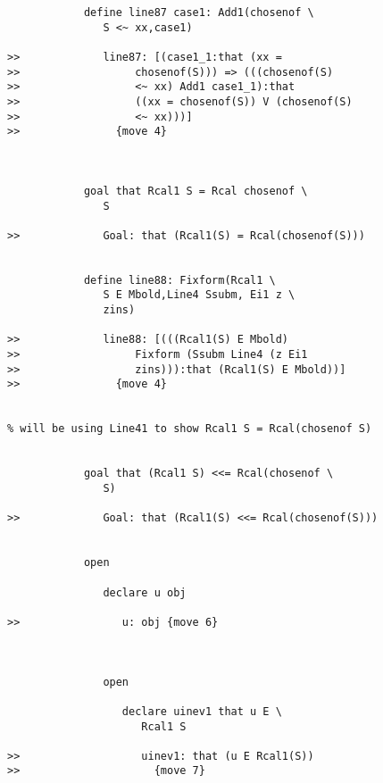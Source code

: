 \documentclass[12pt]{article}
\begin{document}
\begin{verbatim}
            define line87 case1: Add1(chosenof \
               S <~ xx,case1)

>>             line87: [(case1_1:that (xx =
>>                  chosenof(S))) => (((chosenof(S)
>>                  <~ xx) Add1 case1_1):that
>>                  ((xx = chosenof(S)) V (chosenof(S)
>>                  <~ xx)))]
>>               {move 4}



            goal that Rcal1 S = Rcal chosenof \
               S

>>             Goal: that (Rcal1(S) = Rcal(chosenof(S)))


            define line88: Fixform(Rcal1 \
               S E Mbold,Line4 Ssubm, Ei1 z \
               zins)

>>             line88: [(((Rcal1(S) E Mbold)
>>                  Fixform (Ssubm Line4 (z Ei1
>>                  zins))):that (Rcal1(S) E Mbold))]
>>               {move 4}


% will be using Line41 to show Rcal1 S = Rcal(chosenof S)


            goal that (Rcal1 S) <<= Rcal(chosenof \
               S)

>>             Goal: that (Rcal1(S) <<= Rcal(chosenof(S)))


            open

               declare u obj

>>                u: obj {move 6}



               open

                  declare uinev1 that u E \
                     Rcal1 S

>>                   uinev1: that (u E Rcal1(S))
>>                     {move 7}


\end{verbatim}
\end{document}
